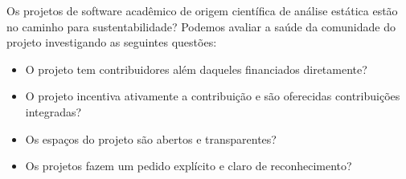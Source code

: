 %
%



Os projetos de software acadêmico de origem científica de análise estática
estão no caminho para sustentabilidade? Podemos avaliar a saúde da comunidade
do projeto investigando as seguintes questões:

\begin{itemize}
  \item O projeto tem contribuidores além daqueles financiados diretamente?
  \item O projeto incentiva ativamente a contribuição e são oferecidas contribuições integradas?
  \item Os espaços do projeto são abertos e transparentes?
  \item Os projetos fazem um pedido explícito e claro de reconhecimento?
\end{itemize}

